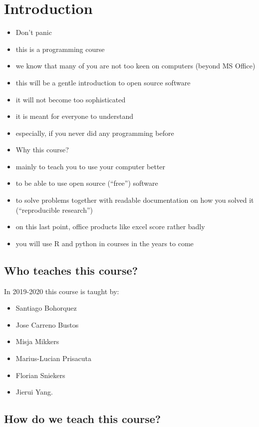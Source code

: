 \documentclass[]{book}
\providecommand{\tightlist}{%
  \setlength{\itemsep}{0pt}\setlength{\parskip}{0pt}}
\begin{document}
\section{Introduction}\label{introduction}

\begin{itemize}
\tightlist
\item
  Don't panic
\item
  this is a programming course
\item
  we know that many of you are not too keen on computers (beyond MS
  Office)
\item
  this will be a gentle introduction to open source software
\item
  it will not become too sophisticated
\item
  it is meant for everyone to understand
\item
  especially, if you never did any programming before
\item
  Why this course?
\item
  mainly to teach you to use your computer better
\item
  to be able to use open source (``free'') software
\item
  to solve problems together with readable documentation on how you
  solved it (``reproducible research'')
\item
  on this last point, office products like excel score rather badly
\item
  you will use R and python in courses in the years to come
\end{itemize}

\subsection{Who teaches this course?}\label{who-teaches-this-course}

In 2019-2020 this course is taught by:

\begin{itemize}
\tightlist
\item
  Santiago Bohorquez
\item
  Jose Carreno Bustos
\item
  Misja Mikkers
\item
  Marius-Lucian Prisacuta
\item
  Florian Sniekers
\item
  Jierui Yang.
\end{itemize}

\subsection{How do we teach this
course?}\label{how-do-we-teach-this-course}
\end{document}

